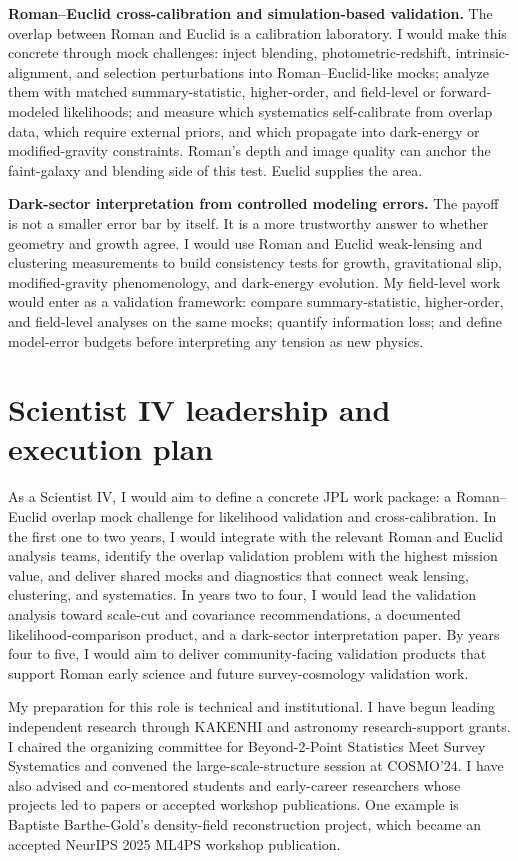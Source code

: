 \documentclass[11pt,letterpaper,sans]{moderncv}
\begin{document}
\textbf{Roman--Euclid cross-calibration and simulation-based validation.} The overlap between Roman and Euclid is a calibration laboratory. I would make this concrete through mock challenges: inject blending, photometric-redshift, intrinsic-alignment, and selection perturbations into Roman--Euclid-like mocks; analyze them with matched summary-statistic, higher-order, and field-level or forward-modeled likelihoods; and measure which systematics self-calibrate from overlap data, which require external priors, and which propagate into dark-energy or modified-gravity constraints. Roman's depth and image quality can anchor the faint-galaxy and blending side of this test. Euclid supplies the area.

\textbf{Dark-sector interpretation from controlled modeling errors.} The payoff is not a smaller error bar by itself. It is a more trustworthy answer to whether geometry and growth agree. I would use Roman and Euclid weak-lensing and clustering measurements to build consistency tests for growth, gravitational slip, modified-gravity phenomenology, and dark-energy evolution. My field-level work would enter as a validation framework: compare summary-statistic, higher-order, and field-level analyses on the same mocks; quantify information loss; and define model-error budgets before interpreting any tension as new physics.

\section{Scientist IV leadership and execution plan}
As a Scientist IV, I would aim to define a concrete JPL work package: a Roman--Euclid overlap mock challenge for likelihood validation and cross-calibration. In the first one to two years, I would integrate with the relevant Roman and Euclid analysis teams, identify the overlap validation problem with the highest mission value, and deliver shared mocks and diagnostics that connect weak lensing, clustering, and systematics. In years two to four, I would lead the validation analysis toward scale-cut and covariance recommendations, a documented likelihood-comparison product, and a dark-sector interpretation paper. By years four to five, I would aim to deliver community-facing validation products that support Roman early science and future survey-cosmology validation work.

My preparation for this role is technical and institutional. I have begun leading independent research through KAKENHI and astronomy research-support grants. I chaired the organizing committee for Beyond-2-Point Statistics Meet Survey Systematics and convened the large-scale-structure session at COSMO'24. I have also advised and co-mentored students and early-career researchers whose projects led to papers or accepted workshop publications. One example is Baptiste Barthe-Gold's density-field reconstruction project, which became an accepted NeurIPS 2025 ML4PS workshop publication.
\end{document}
